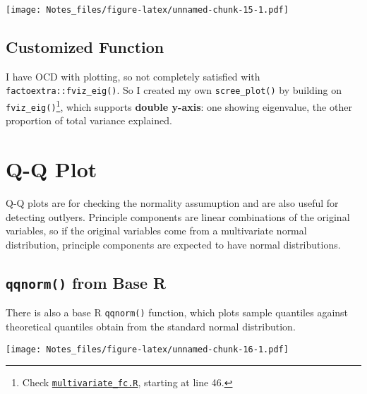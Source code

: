 \documentclass[]{book}
\newenvironment{Shaded}{\begin{snugshade}}{\end{snugshade}}
\newcommand{\KeywordTok}[1]{\textcolor[rgb]{0.13,0.29,0.53}{\textbf{#1}}}
\newcommand{\DecValTok}[1]{\textcolor[rgb]{0.00,0.00,0.81}{#1}}
\newcommand{\StringTok}[1]{\textcolor[rgb]{0.31,0.60,0.02}{#1}}
\newcommand{\OperatorTok}[1]{\textcolor[rgb]{0.81,0.36,0.00}{\textbf{#1}}}
\newcommand{\NormalTok}[1]{#1}
\let\rmarkdownfootnote\footnote%
\def\footnote{\protect\rmarkdownfootnote}
\theoremstyle{definition}
\theoremstyle{definition}
\theoremstyle{definition}
\theoremstyle{remark}
\begin{document}
\texttt{[image: Notes\_files/figure-latex/unnamed-chunk-15-1.pdf]}

\subsection{Customized Function}\label{customized-function}

I have OCD with plotting, so not completely satisfied with
\texttt{factoextra::fviz\_eig()}. So I created my own
\texttt{scree\_plot()} by building on \texttt{fviz\_eig()}\footnote{Check
  \href{https://github.com/liao961120/local_depend/blob/master/R\%20functions/multivariate_fc.R}{\texttt{multivariate\_fc.R}},
  starting at line 46.}, which supports \textbf{double y-axis}: one
showing eigenvalue, the other proportion of total variance explained.

\section{Q-Q Plot}\label{q-q-plot}

Q-Q plots are for checking the normality assumuption and are also useful
for detecting outlyers. Principle components are linear combinations of
the original variables, so if the original variables come from a
multivariate normal distribution, principle components are expected to
have normal distributions.

\subsection{\texorpdfstring{\texttt{qqnorm()} from Base
R}{qqnorm() from Base R}}\label{qqnorm-from-base-r}

There is also a base R \texttt{qqnorm()} function, which plots sample
quantiles against theoretical quantiles obtain from the standard normal
distribution.

\begin{Shaded}
\end{Shaded}

\texttt{[image: Notes\_files/figure-latex/unnamed-chunk-16-1.pdf]}
\end{document}
